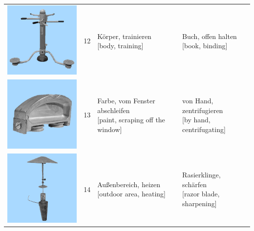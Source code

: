 \documentclass[
  english,
  doc,12pt,twoside,floatsintext]{apa7}
\begin{document}
\begin{center}
\begin{ThreePartTable}
{\begin{longtable}{llll}
\includegraphics[valign=c, scale=0.23]{../materials/unfamiliar/12.png} & 12 & \makecell[l]{Körper, trainieren\\{[body, training]}} & \makecell[l]{Buch, offen halten\\{[book, binding]}}\\
\includegraphics[valign=c, scale=0.23]{../materials/unfamiliar/13.png} & 13 & \makecell[l]{Farbe, vom Fenster abschleifen\\{[paint, scraping off the window]}} & \makecell[l]{von Hand, zentrifugieren\\{[by hand, centrifugating]}}\\
\includegraphics[valign=c, scale=0.23]{../materials/unfamiliar/14.png} & 14 & \makecell[l]{Außenbereich, heizen\\{[outdoor area, heating]}} & \makecell[l]{Rasierklinge, schärfen\\{[razor blade, sharpening]}}\\

\end{longtable}}
\end{ThreePartTable}
\end{center}
\end{document}
